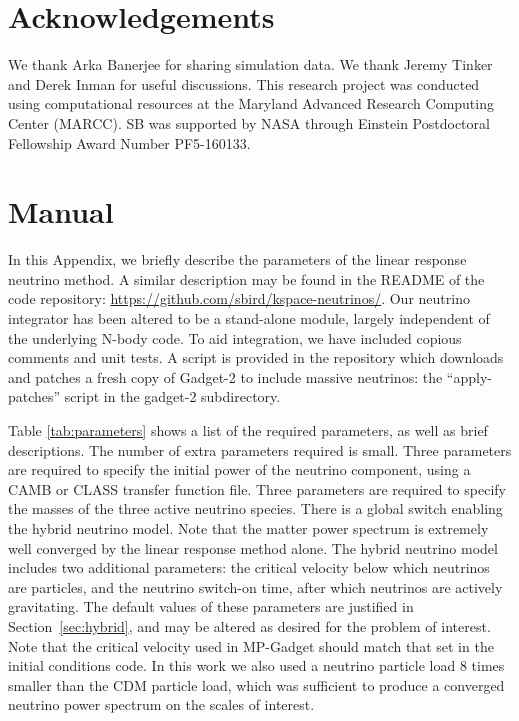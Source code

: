 \documentclass[useAMS, usenatbib]{mnras}
\begin{document}
\section*{Acknowledgements}

We thank Arka Banerjee for sharing simulation data. We thank Jeremy Tinker and Derek Inman for useful discussions.
This research project was conducted using computational resources
at the Maryland Advanced Research Computing Center (MARCC). SB was supported by NASA through
Einstein Postdoctoral Fellowship Award Number PF5-160133.

\appendix

\section{Manual}
\label{sec:manual}

In this Appendix, we briefly describe the parameters of the linear response neutrino method. A similar description may be found in the README of the code repository: \url{https://github.com/sbird/kspace-neutrinos/}. Our neutrino integrator has been altered to be a stand-alone module, largely independent of the underlying N-body code. To aid integration, we have included copious comments and unit tests. A script is provided in the repository which downloads and patches a fresh copy of Gadget-2 to include massive neutrinos: the ``apply-patches'' script in the gadget-2 subdirectory.

Table \ref{tab:parameters} shows a list of the required parameters, as well as brief descriptions. The number of extra parameters required is small. Three parameters are required to specify the initial power of the neutrino component, using a CAMB or CLASS transfer function file. Three parameters are required to specify the masses of the three active neutrino species.
There is a global switch enabling the hybrid neutrino model. Note that the matter power spectrum is extremely well converged by the linear response method alone. The hybrid neutrino model includes two additional parameters: the critical velocity below which neutrinos are particles, and the neutrino switch-on time, after which neutrinos are actively gravitating. The default values of these parameters are justified in Section~\ref{sec:hybrid}, and may be altered as desired for the problem of interest.
Note that the critical velocity used in MP-Gadget should match that set in the initial conditions code. In this work we also used a neutrino particle load $8$ times smaller than the CDM particle load, which was sufficient to produce a converged neutrino power spectrum on the scales of interest.
\end{document}
